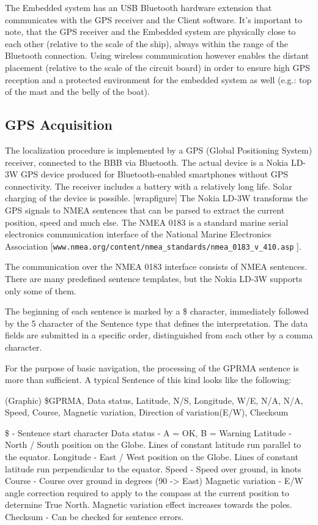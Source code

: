 The Embedded system has an USB Bluetooth hardware extension that communicates with the GPS receiver and the Client software.
It’s important to note, that the GPS receiver and the Embedded system are physically close to each other (relative to the scale of the ship), always within the range of the Bluetooth connection. Using wireless communication however enables the distant placement (relative to the scale of the circuit board) in order to ensure high GPS reception and a protected environment for the embedded system as well (e.g.: top of the mast and the belly of the boat).

\subsection{GPS Acquisition}

The localization procedure is implemented by a GPS (Global Positioning System) receiver, connected to the BBB via Bluetooth. The actual device is a Nokia LD-3W GPS device produced for Bluetooth-enabled smartphones without GPS connectivity. The receiver includes a battery with a relatively long life. Solar charging of the device is possible. [wrapfigure]
The Nokia LD-3W transforms the GPS signals to NMEA sentences that can be parsed to extract the current position, speed and much else. The NMEA 0183 is a standard marine serial electronics communication interface of the National Marine Electronics Association [\verb!www.nmea.org/content/nmea_standards/nmea_0183_v_410.asp! ].

The communication over the NMEA 0183 interface consists of NMEA sentences. There are many predefined sentence templates, but the Nokia LD-3W supports only some of them.

The beginning of each sentence is marked by a \$ character, immediately followed by the 5 character of the Sentence type that defines the interpretation. The data fields are submitted in a specific order, distinguished from each other by a comma character.

For the purpose of basic navigation, the processing of the GPRMA sentence is more than sufficient. A typical Sentence of this kind looks like the following:

(Graphic)
\$GPRMA, Data status, Latitude, N/S, Longitude, W/E, N/A, N/A, Speed, Course, Magnetic variation, Direction of variation(E/W), Checksum

\$ - Sentence start character
Data status - A = OK, B = Warning
Latitude - North / South position on the Globe. Lines of constant latitude run parallel to the equator.
Longitude - East / West position on the Globe. Lines of constant latitude run perpendicular to the equator.
Speed - Speed over ground, in knots
Course - Course over ground in degrees (90 -> East)
Magnetic variation - E/W angle correction required to apply to the compass at the current position to determine True North. Magnetic variation effect increases towards the poles.
Checksum - Can be checked for sentence errors.

